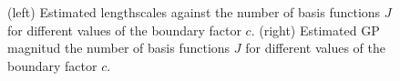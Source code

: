 \documentclass[]{interact}
\theoremstyle{plain}%
\theoremstyle{definition}
\theoremstyle{remark}
\begin{document}
\begin{figure}[H]
\centering
{}
\caption{(left) Estimated lengthscales against the number of basis functions $J$ for different values of the boundary factor $c$. (right) Estimated GP magnitud the number of basis functions $J$ for different values of the boundary factor $c$. }
  \label{fig6_lscale_vs_J}
\end{figure}
\end{document}

